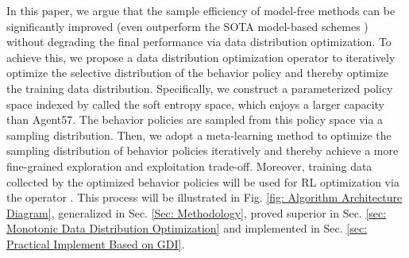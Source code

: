 \documentclass[nohyperref]{article}
\theoremstyle{plain}
\begin{document}
In this paper, we argue that the sample efficiency of model-free methods can be significantly improved  (even outperform the SOTA model-based schemes \cite{dreamerv2}) without degrading the final performance  via data distribution optimization.   To achieve this, we propose a data distribution optimization operator  to iteratively optimize the selective distribution of the behavior policy  and  thereby optimize the training data distribution. Specifically, we  construct a parameterized  policy space indexed by  called the soft entropy space, which enjoys a larger capacity  than Agent57. The behavior policies are sampled  from this policy space via a sampling distribution. Then, we adopt a meta-learning method to  optimize the sampling distribution of behavior policies iteratively and thereby achieve a more fine-grained exploration and exploitation trade-off. Moreover, training data collected by the optimized behavior policies will be used for RL optimization via the operator . This process will be illustrated in Fig. \ref{fig: Algorithm Architecture Diagram}, generalized in Sec. \ref{Sec: Methodology}, proved  superior in Sec. \ref{sec: Monotonic Data Distribution Optimization} and implemented in Sec. \ref{sec: Practical Implement Based on GDI}.
\end{document}
